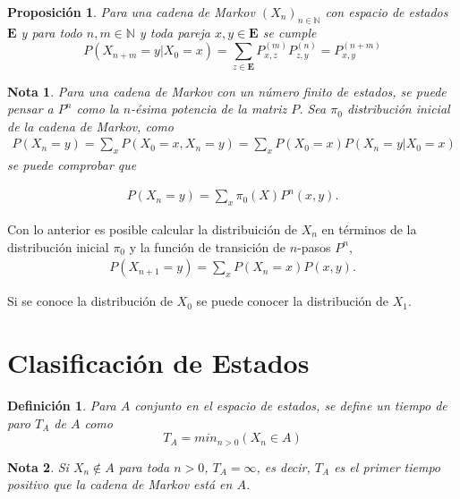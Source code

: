 \documentclass{article}
\newtheorem{Def}{Definición}
\newtheorem{Note}{Nota}
\newtheorem{Prop}{Proposición}
\newcommand{\nat}{\mathbb{N}}
\newcommand{\Eb}{\mathbf{E}}
\begin{document}
\begin{Prop}
Para una cadena de Markov $\left(X_{n}\right)_{n\in\nat}$ con espacio de estados $\Eb$ y para todo $n,m\in \nat$ y toda pareja $x,y\in\Eb$ se cumple
\begin{equation}
P\left(X_{n+m}=y|X_{0}=x\right)=\sum_{z\in\Eb}P_{x,z}^{(m)}P_{z,y}^{(n)}=P_{x,y}^{(n+m)}
\end{equation}
\end{Prop}

\begin{Note}
Para una cadena de Markov con un número finito de estados, se puede pensar a $P^{n}$ como la $n$-ésima potencia de la matriz $P$. Sea $\pi_{0}$ distribución inicial de la cadena de Markov, como 
\begin{eqnarray}
P\left(X_{n}=y\right)=\sum_{x} P\left(X_{0}=x,X_{n}=y\right)=\sum_{x} P\left(X_{0}=x\right)P\left(X_{n}=y|X_{0}=x\right)
\end{eqnarray}
se puede comprobar que 

\begin{eqnarray}
P\left(X_{n}=y\right)=\sum_{x} \pi_{0}\left(X\right)P^{n}\left(x,y\right).
\end{eqnarray}
\end{Note}

Con lo anterior es posible calcular la distribuición de $X_{n}$ en términos de la distribución inicial $\pi_{0}$ y la función de transición de $n$-pasos $P^{n}$,
\begin{eqnarray}
P\left(X_{n+1}=y\right)=\sum_{x} P\left(X_{n}=x\right)P\left(x,y\right).
\end{eqnarray}

Si se conoce la distribución de $X_{0}$ se puede conocer la distribución de $X_{1}$.

\section{Clasificación de Estados}

\begin{Def}
Para $A$ conjunto en el espacio de estados, se define un tiempo de paro $T_{A}$ de $A$ como
\begin{equation}
T_{A}=min_{n>0}\left(X_{n}\in A\right)
\end{equation}
\end{Def}

\begin{Note}
Si $X_{n}\notin A$ para toda $n>0$, $T_{A}=\infty$, es decir,  $T_{A}$ es el primer tiempo positivo que la cadena de Markov está en $A$.
\end{Note}
\end{document}
